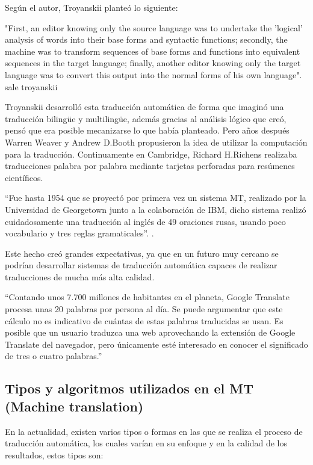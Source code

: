 \documentclass[conference]{IEEEtran}
\begin{document}
\vspace{1.6cm}
Según el autor, Troyanskii planteó lo siguiente:

"First, an editor knowing only the source language was to undertake the 'logical' analysis of words into their base forms and syntactic functions; secondly, the machine was to transform sequences of base forms and functions into equivalent sequences in the target language; finally, another editor knowing only the target language was to convert this output into the normal forms of his own language".\cite{b3} sale troyanskii

Troyanskii desarrolló esta traducción automática de forma que imaginó una traducción bilingüe y multilingüe, además gracias al análisis lógico que creó, pensó que era posible mecanizarse lo que había planteado. Pero años después Warren Weaver y Andrew D.Booth propusieron la idea de utilizar la computación para la traducción. Continuamente en Cambridge, Richard H.Richens realizaba traducciones palabra por palabra mediante tarjetas perforadas para resúmenes científicos.

“Fue hasta 1954 que se proyectó por primera vez un sistema MT, realizado por la Universidad de Georgetown junto a la colaboración de IBM, dicho sistema realizó cuidadosamente una traducción al inglés de 49 oraciones rusas, usando poco vocabulario y tres reglas gramaticales”. \cite{b3}.%

Este hecho creó grandes expectativas, ya que en un futuro muy cercano se podrían desarrollar sistemas de traducción automática capaces de realizar traducciones de mucha más alta calidad.

“Contando unos 7.700 millones de habitantes en el planeta, Google Translate procesa unas 20
palabras por persona al día. Se puede argumentar que este cálculo no es indicativo de
cuántas de estas palabras traducidas se usan. Es posible que un usuario traduzca una
web aprovechando la extensión de Google Translate del navegador, pero únicamente
esté interesado en conocer el significado de tres o cuatro palabras.”\cite{b13}


\subsection{Tipos y algoritmos utilizados en el MT (Machine translation)}
En la actualidad, existen varios tipos o formas en las que se realiza el proceso de traducción automática, los cuales varían en su enfoque y en la calidad de los resultados, estos tipos son:
\end{document}
